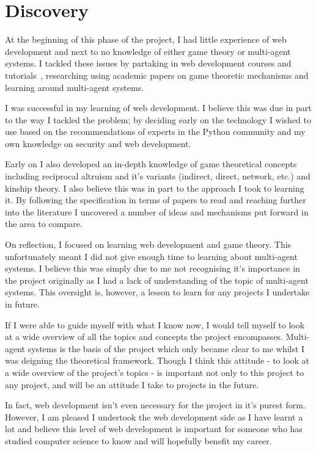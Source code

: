 \documentclass[]{final_report}
\begin{document}
\section{Discovery}
At the beginning of this phase of the project, I had little experience of web development and next to no knowledge of either game theory or multi-agent systems. I tackled these issues by partaking in web development courses and tutorials~\cite{flask_tut, swi_web_tut}, researching using academic papers on game theoretic mechanisms and learning around multi-agent systems.\par 
I was successful in my learning of web development. I believe this was due in part to the way I tackled the problem; by deciding early on the technology I wished to use based on the recommendations of experts in the Python community and my own knowledge on security and web development.\par 
Early on I also developed an in-depth knowledge of game theoretical concepts including reciprocal altruism and it's variants (indirect, direct, network, etc.) and kinship theory. I also believe this was in part to the approach I took to learning it. By following the specification in terms of papers to read and reaching further into the literature I uncovered a number of ideas and mechanisms put forward in the area to compare.\par 
On reflection, I focused on learning web development and game theory. This unfortunately meant I did not give enough time to learning about multi-agent systems. I believe this was simply due to me not recognising it's importance in the project originally as I had a lack of understanding of the topic of multi-agent systems. This oversight is, however, a lesson to learn for any projects I undertake in future.\par
If I were able to guide myself with what I know now, I would tell myself to look at a wide overview of all the topics and concepts the project encompasses. Multi-agent systems is the basis of the project which only became clear to me whilst I was deigning the theoretical framework. Though I think this attitude - to look at a wide overview of the project's topics - is important not only to this project to any project, and will be an attitude I take to projects in the future.\par 
In fact, web development isn't even necessary for the project in it's purest form. However, I am pleased I undertook the web development side as I have learnt a lot and believe this level of web development is important for someone who has studied computer science to know and will hopefully benefit my career.
\end{document}
